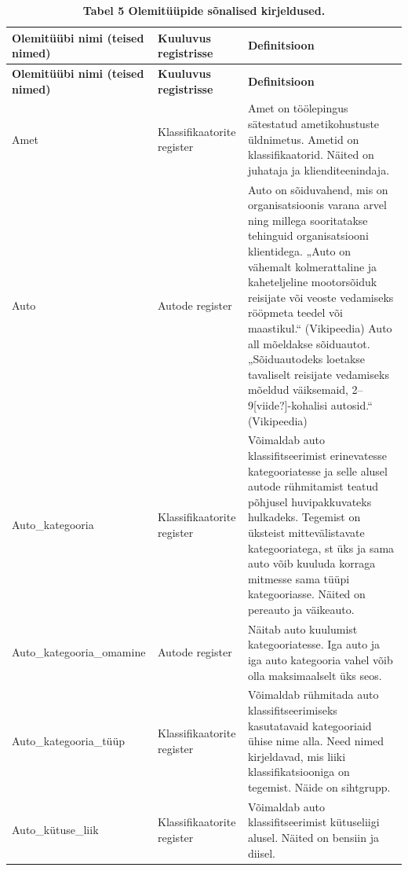 \begin{longtabu} to \textwidth {| X | X | X[2] |} 
	\caption{\textbf{Tabel 5 Olemitüüpide sõnalised kirjeldused.}} \\
	\hline
	\textbf{Olemitüübi nimi (teised nimed)}   &   \textbf{Kuuluvus registrisse} & \textbf{Definitsioon} \\
	\hline
	\endfirsthead
	\hline
	\textbf{Olemitüübi nimi (teised nimed)}   &   \textbf{Kuuluvus registrisse} & \textbf{Definitsioon} \\
	\hline
	\endhead
	Amet
	& Klassifikaatorite register
	& Amet on töölepingus sätestatud ametikohustuste üldnimetus. Ametid on klassifikaatorid. Näited on juhataja ja klienditeenindaja. \\ \hline
	
	Auto
	& Autode register
	& Auto on sõiduvahend, mis on organisatsioonis varana arvel ning millega sooritatakse tehinguid organisatsiooni klientidega. „Auto on vähemalt kolmerattaline ja kaheteljeline mootorsõiduk reisijate või veoste vedamiseks rööpmeta teedel või maastikul.“ (Vikipeedia) Auto all mõeldakse sõiduautot. „Sõiduautodeks loetakse tavaliselt reisijate vedamiseks mõeldud väiksemaid, 2–9[viide?]-kohalisi autosid.“ (Vikipeedia) \\ \hline
	
	Auto\_kategooria
	& Klassifikaatorite register
	& Võimaldab auto klassifitseerimist erinevatesse kategooriatesse ja selle alusel autode rühmitamist teatud põhjusel huvipakkuvateks hulkadeks. Tegemist on üksteist mittevälistavate kategooriatega, st üks ja sama auto võib kuuluda korraga mitmesse sama tüüpi kategooriasse. Näited on pereauto ja väikeauto. \\ \hline
	
	Auto\_kategooria\_omamine
	& Autode register
	& Näitab auto kuulumist kategooriatesse. Iga auto ja iga auto kategooria vahel võib olla maksimaalselt üks seos. \\ \hline
	
	Auto\_kategooria\_tüüp
	& Klassifikaatorite register 
	& Võimaldab rühmitada auto klassifitseerimiseks kasutatavaid kategooriaid ühise nime alla. Need nimed kirjeldavad, mis liiki klassifikatsiooniga on tegemist. Näide on sihtgrupp. \\ \hline
	
	Auto\_kütuse\_liik
	& Klassifikaatorite register 
	& Võimaldab auto klassifitseerimist kütuseliigi alusel. Näited on bensiin ja diisel. \\ \hline
	

\end{longtabu}
